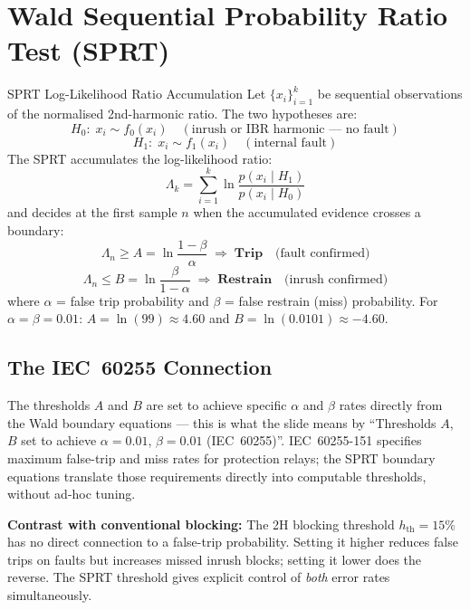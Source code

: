 \documentclass[12pt,a4paper]{article}
\begin{document}
\section{Wald Sequential Probability Ratio Test (SPRT)}

\begin{formulabox}{SPRT Log-Likelihood Ratio Accumulation}
Let $\{x_i\}_{i=1}^k$ be sequential observations of the normalised 2nd-harmonic ratio. The two hypotheses are:
\[
  H_0:\; x_i \sim f_0(x_i) \quad (\text{inrush or IBR harmonic --- no fault})
\]
\[
  H_1:\; x_i \sim f_1(x_i) \quad (\text{internal fault})
\]
The SPRT accumulates the log-likelihood ratio:
\[
  \Lambda_k = \sum_{i=1}^{k} \ln \frac{p(x_i \mid H_1)}{p(x_i \mid H_0)}
\]
and decides at the first sample $n$ when the accumulated evidence crosses a boundary:
\[
  \Lambda_n \geq A = \ln\!\frac{1-\beta}{\alpha} \;\Rightarrow\; \textbf{Trip} \quad \text{(fault confirmed)}
\]
\[
  \Lambda_n \leq B = \ln\!\frac{\beta}{1-\alpha} \;\Rightarrow\; \textbf{Restrain} \quad \text{(inrush confirmed)}
\]
where $\alpha$ = false trip probability and $\beta$ = false restrain (miss) probability. For $\alpha = \beta = 0.01$: $A = \ln(99) \approx 4.60$ and $B = \ln(0.0101) \approx -4.60$.
\end{formulabox}

\subsection{The IEC~60255 Connection}

The thresholds $A$ and $B$ are set to achieve specific $\alpha$ and $\beta$ rates directly from the Wald boundary equations --- this is what the slide means by ``Thresholds $A$, $B$ set to achieve $\alpha=0.01$, $\beta=0.01$ (IEC~60255)''. IEC~60255-151 specifies maximum false-trip and miss rates for protection relays; the SPRT boundary equations translate those requirements directly into computable thresholds, without ad-hoc tuning.

\textbf{Contrast with conventional blocking:} The 2H blocking threshold $h_\mathrm{th} = 15\%$ has no direct connection to a false-trip probability. Setting it higher reduces false trips on faults but increases missed inrush blocks; setting it lower does the reverse. The SPRT threshold gives explicit control of \textit{both} error rates simultaneously.

\end{document}
